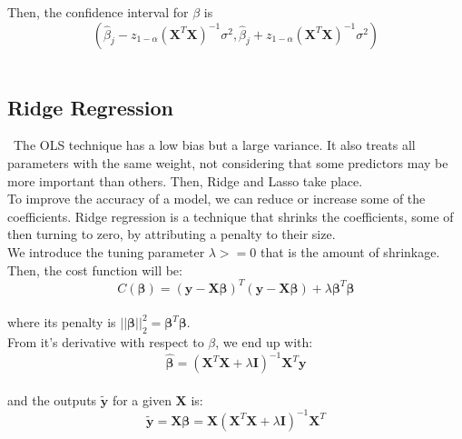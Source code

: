 Then, the confidence interval for $\beta$ is\\

\begin{equation}
\label{eq6}
(\hat{\beta}_j-z_{1-\alpha}(\textbf{X}^T\textbf{X})^{-1}\sigma^2, \hat{\beta}_j+ z_{1-\alpha}(\textbf{X}^T\textbf{X})^{-1}\sigma^2)
\end{equation}\\

\subsection{Ridge Regression}
\label{chap:Ridge Regression}

\quad \, The OLS technique has a low bias but a large variance. It also treats all parameters with the same weight, not considering that some predictors may be more important than others. Then, Ridge and Lasso take place.\\

To improve the accuracy of a model, we can reduce or increase some of the coefficients. Ridge regression is a technique that shrinks the coefficients, some of then turning to zero, by attributing a penalty to their size.\\

We introduce the tuning parameter $\lambda>=0$ that is the amount of shrinkage. Then, the cost function will be:\\

$$C(\boldsymbol{\beta}) = (\boldsymbol{y} - \boldsymbol{X\beta})^T(\boldsymbol{y} - \boldsymbol{X\beta}) + \lambda \boldsymbol{\beta}^T\boldsymbol{\beta}$$\\

\noindent where its penalty is $||\boldsymbol{\beta}||_2^2 = \boldsymbol{\beta}^T\boldsymbol{\beta}$.\\

From it's derivative with respect to $\beta$, we end up with:\\

\begin{equation}
\label{eq7}
\boldsymbol{\hat\beta} = ( \boldsymbol{X}^T\boldsymbol{X} + \lambda \boldsymbol{I} )^{-1} \boldsymbol{X}^T \boldsymbol{y}
\end{equation}\\

\noindent and the outputs $\boldsymbol{\tilde{y}}$ for a given  $\boldsymbol{X}$ is:\\

\begin{equation}
\label{eq8}
\boldsymbol{\tilde{y}} = \boldsymbol{X\beta} = \boldsymbol{X}(\boldsymbol{X}^T\boldsymbol{X}  + \lambda \boldsymbol{I})^{-1}\boldsymbol{X}^T
\end{equation}\\

